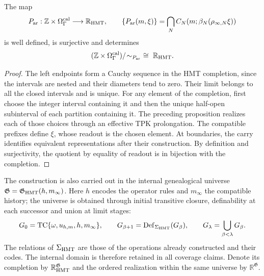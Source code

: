 \begin{proposition}
\label{hmtfg:cobertura-arquimediana}
The map
\[
 P_{\rm ar}:\mathbb Z\times\Omega_\Gamma^{\rm cal}
       \longrightarrow\mathbb R_{\rm HMT},\qquad
 \{P_{\rm ar}(m,\xi)\}
    =\bigcap_N C_N(m;\beta_N(\rho_{\infty,N}\xi))
\]
is well defined, is surjective and determines
\[
 (\mathbb Z\times\Omega_\Gamma^{\rm cal})/\!\sim_{P_{\rm ar}}
       \ \cong\ \mathbb R_{\rm HMT}.
\]
\end{proposition}
\begin{proof}
The left endpoints form a Cauchy sequence in the HMT completion, since the intervals are nested and their diameters tend to zero. Their limit belongs to all the closed intervals and is unique. For any element of the completion, first choose the integer interval containing it and then the unique half-open subinterval of each partition containing it. The preceding proposition realizes each of those choices through an effective TPK prolongation. The compatible prefixes define \(\xi\), whose readout is the chosen element. At boundaries, the carry identifies equivalent representations after their construction. By definition and surjectivity, the quotient by equality of readout is in bijection with the completion.
\end{proof}

The construction is also carried out in the internal genealogical universe \(\mathfrak G=\mathfrak G_{\rm HMT}(h,m_\infty)\). Here \(h\) encodes the operator rules and \(m_\infty\) the compatible history; the universe is obtained through initial transitive closure, definability at each successor and union at limit stages:
\[
 G_0=\operatorname{TC}\{\omega,u_{h,m},h,m_\infty\},\qquad
 G_{\beta+1}=\operatorname{Def}_{\Sigma_{\rm HMT}}(G_\beta),\qquad
 G_\lambda=\bigcup_{\beta<\lambda}G_\beta .
\]
The relations of \(\Sigma_{\rm HMT}\) are those of the operations already constructed and their codes. The internal domain is therefore retained in all coverage claims. Denote its completion by \(\mathbb R_{\rm HMT}^{\mathfrak G}\) and the ordered realization within the same universe by \(\mathbb R^{\mathfrak G}\).

